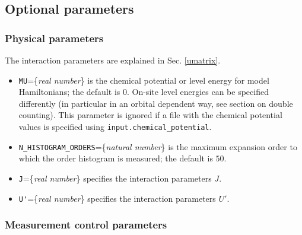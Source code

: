 \documentclass[aps,prb,floatfix,superscriptaddress,twocolumn,notitlepage]{revtex4-1}
\begin{document}
\subsection{Optional parameters}

\subsubsection{Physical parameters}

The interaction parameters are explained in Sec. \ref{umatrix}.
\begin{itemize}
\item \verb#MU#=\{\emph{real number}\} is the chemical potential or level energy for model Hamiltonians; the default is $0$. On-site level energies can be specified differently (in particular in an orbital dependent way, see section on double counting). This parameter is ignored if a file with the chemical potential values is specified using \verb#input.chemical_potential#.
\item \verb#N_HISTOGRAM_ORDERS#=\{\emph{natural number}\} is the maximum expansion order to which the order histogram is measured; the default is $50$.
\item \verb#J#=\{\emph{real number}\} specifies the interaction parameters $J$.
\item \verb#U'#=\{\emph{real number}\} specifies the interaction parameters $U'$.
\end{itemize}

\subsubsection{Measurement control parameters}
\end{document}

